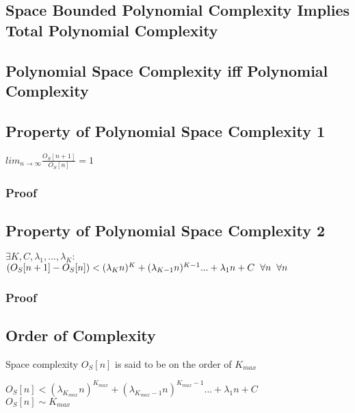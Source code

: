\documentclass[11pt]{article}
\begin{document}
\subsection{Space Bounded Polynomial Complexity Implies Total Polynomial Complexity}
\subsection{Polynomial Space Complexity iff Polynomial Complexity}








\subsection{Property of Polynomial Space Complexity 1}
\begin{center}
$
lim_{n \rightarrow \infty} \frac{O_S[n+1]}{O_S[n]} = 1
$
\end{center}
\subsubsection{Proof}







\subsection{Property of Polynomial Space Complexity 2}
\begin{center}
$
\exists K,C,\lambda_1,...,\lambda_K :
$
\\ \vspace{2mm}
$
( O_S[n+1] - O_S[n] ) < (\lambda_K n)^K + (\lambda_{K-1} n)^{K-1}... + \lambda_1 n + C \hspace{2mm} \forall n \hspace{2mm} \forall n
$
\end{center}
\subsubsection{Proof}








\subsection{Order of Complexity}
Space complexity $O_S[n]$ is said to be on the order of $K_{max}$
\begin{center}
$
O_S[n] < (\lambda_{K_{max}} n)^{K_{max}} + (\lambda_{K_{max}-1} n)^{K_{max}-1}... + \lambda_1 n + C
$
\\ \vspace{2mm}
$
O_S[n] \sim K_{max}
$
\end{center}
\end{document}

